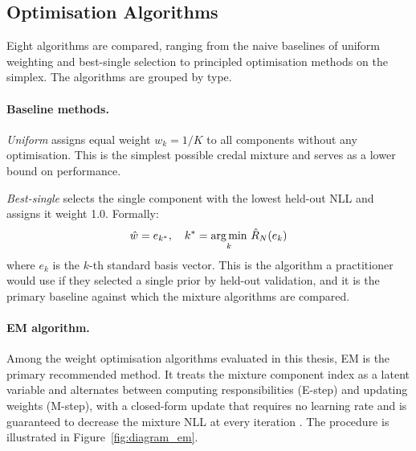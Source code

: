 \subsection{Optimisation Algorithms}

Eight algorithms are compared, ranging 
from the naive baselines of uniform 
weighting and best-single selection to 
principled optimisation methods on the 
simplex. The algorithms are grouped by 
type.

\paragraph{Baseline methods.}

\textit{Uniform} assigns equal weight 
$w_k = 1/K$ to all components without 
any optimisation. This is the simplest 
possible credal mixture and serves as 
a lower bound on performance.

\textit{Best-single} selects the single 
component with the lowest held-out NLL 
and assigns it weight 1.0. Formally:
\begin{equation}
    \hat{w} = e_{k^*}, \quad 
    k^* = \operatorname*{arg\,min}_k\, 
    \hat{R}_N(e_k)
\end{equation}
where $e_k$ is the $k$-th standard 
basis vector. This is the algorithm 
a practitioner would use if they 
selected a single prior by held-out 
validation, and it is the primary 
baseline against which the mixture 
algorithms are compared.

\paragraph{EM algorithm.}

Among the weight optimisation algorithms 
evaluated in this thesis, EM is the 
primary recommended method. It treats 
the mixture component index as a latent 
variable and alternates between computing 
responsibilities (E-step) and updating 
weights (M-step), with a closed-form 
update that requires no learning rate 
and is guaranteed to decrease the 
mixture NLL at every iteration 
\citep{dempster1977}. The procedure 
is illustrated in 
Figure~\ref{fig:diagram_em}.



